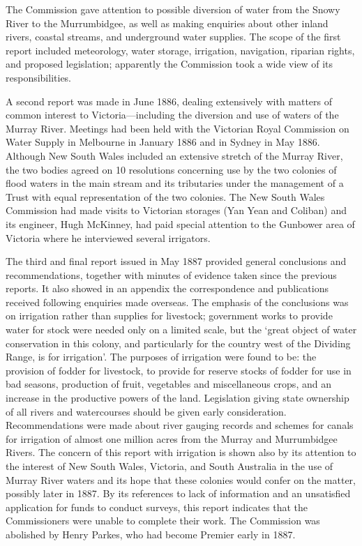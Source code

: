 The Commission gave attention to possible diversion of water from the
Snowy River to the Murrumbidgee, as well as making enquiries about
other inland rivers, coastal streams, and underground water supplies.
The scope of the first report included meteorology, water storage,
irrigation, navigation, riparian rights, and proposed legislation;
apparently the Commission took a wide view of its responsibilities.

A second report was made in June 1886, dealing extensively with
matters of common interest to Victoria---including the diversion and
use of waters of the Murray River.  Meetings had been held with the
Victorian Royal Commission on Water Supply in Melbourne in January
1886 and in Sydney in May 1886.  Although New South Wales included an
extensive stretch of the Murray River, the two bodies agreed on 10
resolutions concerning use by the two colonies of flood waters in the
main stream and its tributaries under the management of a Trust with
equal representation of the two colonies.  The New South Wales
Commission had made visits to Victorian storages (Yan Yean and
Coliban) and its engineer, Hugh McKinney, had paid special attention
to the Gunbower area of Victoria where he interviewed several
irrigators.

The third and final report issued in May 1887 provided general
conclusions and recommendations, together with minutes of evidence
taken since the previous reports.  It also showed in an appendix the
correspondence and publications received following enquiries made
overseas.  The emphasis of the conclusions was on irrigation rather
than supplies for livestock; government works to provide water for
stock were needed only on a limited scale, but the `great object of
water conservation in this colony, and particularly for the country
west of the Dividing Range, is for irrigation'.  The purposes of
irrigation were found to be: the provision of fodder for livestock, to
provide for reserve stocks of fodder for use in bad seasons,
production of fruit, vegetables and miscellaneous crops, and an
increase in the productive powers of the land.  Legislation giving
state ownership of all rivers and watercourses should be given early
consideration.  Recommendations were made about river gauging records
and schemes for canals for irrigation of almost one million acres from
the Murray and Murrumbidgee Rivers.  The concern of this report with
irrigation is shown also by its attention to the interest of New South
Wales, Victoria, and South Australia in the use of Murray River waters
and its hope that these colonies would confer on the matter, possibly
later in 1887.  By its references to lack of information and an
unsatisfied application for funds to conduct surveys, this report
indicates that the Commissioners were unable to complete their work.
The Commission was abolished by Henry Parkes, who had become Premier
early in 1887.

